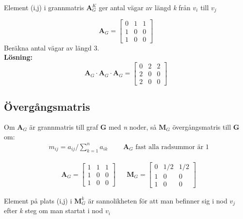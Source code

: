 \begin{sats}
	Element (i,j) i grannmatris $\mathbf{A}_G^K$ ger antal vägar av längd \textit{k} från $v_i$ till $v_j$
\end{sats}
\begin{Ex}
	\[
	\mathbf{A}_G = 
	\begin{bmatrix}
		0 & 1 & 1\\
		1 & 0 & 0\\
		1 & 0 & 0
	\end{bmatrix}
	\]
	Beräkna antal vägar av längd 3.\\
	\textbf{Lösning:}
	\[
	\mathbf{A}_G \cdot \mathbf{A}_G \cdot \mathbf{A}_G = 
	\begin{bmatrix}
		0 & 2 & 2\\
		2 & 0 & 0\\
		2 & 0 & 0
	\end{bmatrix}
	\]
\end{Ex}
\subsection{Övergångsmatris} %
\label{sec:section_name}
Om $\mathbf{A}_G$ är grannmatris till graf \textbf{G} med \textit{n} noder, så $\mathbf{M}_G$ övergångsmatris till \textbf{G} om:
\begin{align*}
&m_{ij} = a_{ij} / \sum\limits_{k = 1}^{n}a_{ik} 
&&\mbox{ $\mathbf{A}_G$ fast alla radsummor är 1}
\end{align*}

\begin{Ex}
	\begin{align*}
	& \mathbf{A}_G = 
	\begin{bmatrix}
		1 & 1 & 1\\
		1 & 0 & 0\\
		1 & 0 & 0
	\end{bmatrix}
	&& \mathbf{M}_G = 
	\begin{bmatrix}
		0 & 1/2 & 1/2\\
		1 & 0 & 0\\
		1 & 0 & 0
	\end{bmatrix}
	\end{align*}
\end{Ex}
Element på plats (i,j) i $\mathbf{M}_G^k$ är sannolikheten för att man befinner sig i nod $v_j$ efter \textit{k} steg om man startat i nod $v_i$
